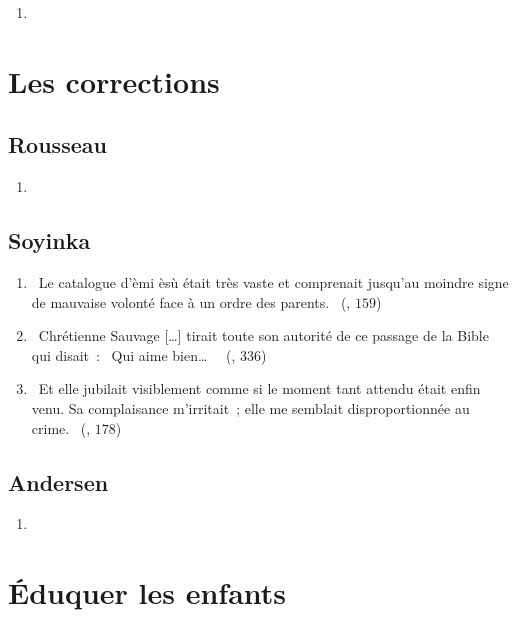 \documentclass[a4paper, 11pt, hidelinks]{article}
\newcommand{\rb}[1]{\Romanbar{#1}}
\begin{document}
\begin{enumerate}
    \item 
\end{enumerate}

\section{Les corrections}




\subsection{Rousseau}

\begin{enumerate}
    \item 
\end{enumerate}


\subsection{Soyinka}


\begin{enumerate}
    \item \og{} Le catalogue d’èmi èsù était très vaste et comprenait jusqu’au moindre signe de mauvaise volonté face à un ordre des parents. \fg{} (\rb{6}, $159$)
    \item \og{} Chrétienne Sauvage […] tirait toute son autorité de ce passage de la Bible qui disait : \og{} Qui aime bien… \fg{} \fg{} (\rb{12}, $336$)
    \item \og{} Et elle jubilait visiblement comme si le moment tant attendu était enfin venu. Sa complaisance m’irritait ; elle me semblait disproportionnée au crime. \fg{} (\rb{6}, $178$) 
\end{enumerate}


\subsection{Andersen}


\begin{enumerate}
    \item 
\end{enumerate}



\section{Éduquer les enfants}
\end{document}

